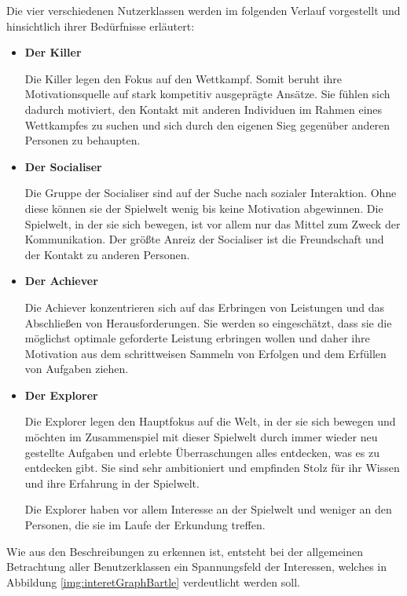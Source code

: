 \documentclass[bibliography=totoc,listof=totoc,BCOR=5mm,DIV=12,oneside]{scrbook}
\begin{document}
\par Die vier verschiedenen Nutzerklassen werden im folgenden Verlauf vorgestellt und hinsichtlich ihrer Bedürfnisse erläutert:
\begin{itemize}
\item \textbf{Der Killer}
\par Die Killer legen den Fokus auf den Wettkampf. Somit beruht ihre Motivationsquelle auf stark kompetitiv ausgeprägte Ansätze. Sie fühlen sich dadurch motiviert, den Kontakt mit anderen Individuen im Rahmen eines Wettkampfes zu suchen und sich durch den eigenen Sieg gegenüber anderen Personen zu behaupten.

\item \textbf{Der Socialiser}
\par Die Gruppe der Socialiser sind auf der Suche nach sozialer Interaktion. Ohne diese können sie der Spielwelt wenig bis keine Motivation abgewinnen. Die Spielwelt, in der sie sich bewegen, ist vor allem nur das Mittel zum Zweck der Kommunikation. Der größte Anreiz der Socialiser ist die Freundschaft und der Kontakt zu anderen Personen.

\newpage
\item \textbf{Der Achiever}
\par Die Achiever konzentrieren sich auf das Erbringen von Leistungen und das Abschließen von Herausforderungen. Sie werden so eingeschätzt, dass sie die möglichst optimale geforderte Leistung erbringen wollen und daher ihre Motivation aus dem schrittweisen Sammeln von Erfolgen und dem Erfüllen von Aufgaben ziehen.

\item \textbf{Der Explorer}
\par Die Explorer legen den Hauptfokus auf die Welt, in der sie sich bewegen und möchten im Zusammenspiel mit dieser Spielwelt durch immer wieder neu gestellte Aufgaben und erlebte Überraschungen alles entdecken, was es zu entdecken gibt. Sie sind sehr ambitioniert und empfinden Stolz für ihr Wissen und ihre Erfahrung in der Spielwelt. 
\par Die Explorer haben vor allem Interesse an der Spielwelt und weniger an den Personen, die sie im Laufe der Erkundung treffen.
\end{itemize}

\par Wie aus den Beschreibungen zu erkennen ist, entsteht bei der allgemeinen Betrachtung aller Benutzerklassen ein Spannungsfeld der Interessen, welches in Abbildung \ref{img:interetGraphBartle} verdeutlicht werden soll.
\end{document}
